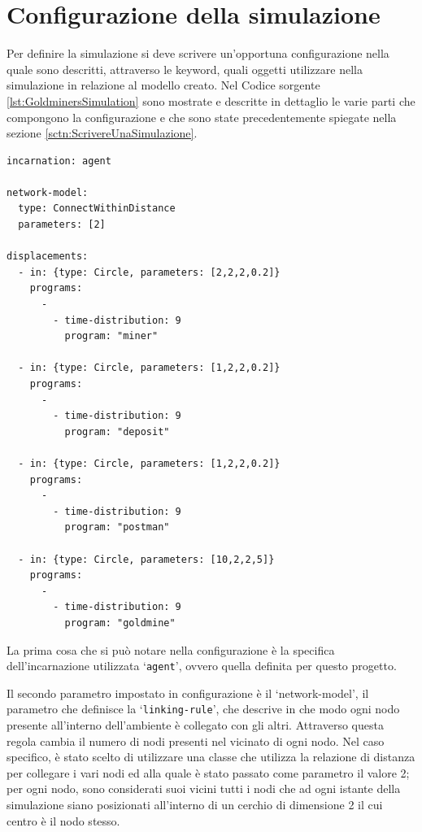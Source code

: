 \section{Configurazione della simulazione}
Per definire la simulazione si deve scrivere un'opportuna configurazione nella quale sono descritti, attraverso le keyword, quali oggetti utilizzare nella simulazione in relazione al modello creato. Nel Codice sorgente \ref{lst:GoldminersSimulation} sono mostrate e descritte in dettaglio le varie parti che compongono la configurazione e che sono state precedentemente spiegate nella sezione \ref{sctn:ScrivereUnaSimulazione}.

\switchToProlog{}
\begin{lstlisting}[float,firstnumber=1,label={lst:GoldminersSimulation},caption={Configurazione simulazione Goldminers}]
incarnation: agent

network-model:
  type: ConnectWithinDistance
  parameters: [2]

displacements:
  - in: {type: Circle, parameters: [2,2,2,0.2]}
    programs:
      -
        - time-distribution: 9
          program: "miner"

  - in: {type: Circle, parameters: [1,2,2,0.2]}
    programs:
      -
        - time-distribution: 9
          program: "deposit"

  - in: {type: Circle, parameters: [1,2,2,0.2]}
    programs:
      -
        - time-distribution: 9
          program: "postman"

  - in: {type: Circle, parameters: [10,2,2,5]}
    programs:
      -
        - time-distribution: 9
          program: "goldmine"
\end{lstlisting}

La prima cosa che si può notare nella configurazione è la specifica dell'incarnazione utilizzata `\texttt{agent}', ovvero quella definita per questo progetto.

Il secondo parametro impostato in configurazione è il `network-model', il parametro che definisce la `\texttt{linking-rule}', che descrive in che modo ogni nodo presente all'interno dell'ambiente è collegato con gli altri. Attraverso questa regola cambia il numero di nodi presenti nel vicinato di ogni nodo. Nel caso specifico, è stato scelto di utilizzare una classe che utilizza la relazione di distanza per collegare i vari nodi ed alla quale è stato passato come parametro il valore 2; per ogni nodo, sono considerati suoi vicini tutti i nodi che ad ogni istante della simulazione siano posizionati all'interno di un cerchio di dimensione 2 il cui centro è il nodo stesso.

